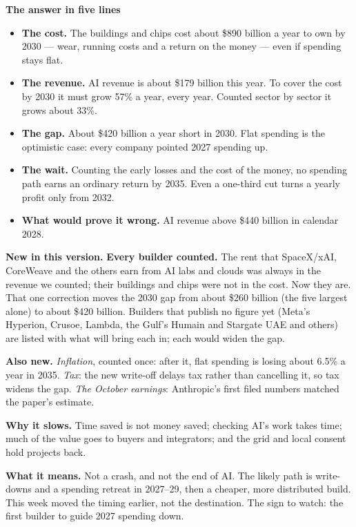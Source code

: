 \documentclass[11pt,letterpaper]{article}
\newcommand{\lead}[1]{{\sffamily\bfseries\color{lead}#1}}
\begin{document}
\colorbox{boxbg}{\begin{minipage}{0.97\textwidth}\vspace{3pt}
\textbf{The answer in five lines}
\begin{itemize}\setlength\itemsep{1pt}
\item \textbf{The cost.} The buildings and chips cost about \$890 billion a year to own by 2030 --- wear, running costs and a return on the money --- even if spending stays flat.
\item \textbf{The revenue.} AI revenue is about \$179 billion this year. To cover the cost by 2030 it must grow 57\% a year, every year. Counted sector by sector it grows about 33\%.
\item \textbf{The gap.} About \$420 billion a year short in 2030. Flat spending is the optimistic case: every company pointed 2027 spending up.
\item \textbf{The wait.} Counting the early losses and the cost of the money, no spending path earns an ordinary return by 2035. Even a one-third cut turns a yearly profit only from 2032.
\item \textbf{What would prove it wrong.} AI revenue above \$440 billion in calendar 2028.
\end{itemize}\vspace{2pt}\end{minipage}}

\lead{New in this version.} \textbf{Every builder counted.} The rent that SpaceX/xAI, CoreWeave and the others earn from AI labs and clouds was always in the revenue we counted; their buildings and chips were not in the cost. Now they are. That one correction moves the 2030 gap from about \$260 billion (the five largest alone) to about \$420 billion. Builders that publish no figure yet (Meta's Hyperion, Crusoe, Lambda, the Gulf's Humain and Stargate UAE and others) are listed with what will bring each in; each would widen the gap.

\lead{Also new.} \emph{Inflation}, counted once: after it, flat spending is losing about 6.5\% a year in 2035. \emph{Tax}: the new write-off delays tax rather than cancelling it, so tax widens the gap. \emph{The October earnings}: Anthropic's first filed numbers matched the paper's estimate.

\lead{Why it slows.} Time saved is not money saved; checking AI's work takes time; much of the value goes to buyers and integrators; and the grid and local consent hold projects back.

\lead{What it means.} Not a crash, and not the end of AI. The likely path is write-downs and a spending retreat in 2027--29, then a cheaper, more distributed build. This week moved the timing earlier, not the destination. The sign to watch: the first builder to guide 2027 spending down.
\end{document}
